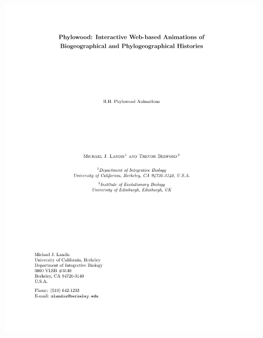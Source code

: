 \documentclass[11pt]{article}
\begin{document}
\begin{figure}
\begin{center}
\includegraphics[width=6.50in]{phylowood}
\label{phylowood}
\end{center}
\end{figure}
\end{document}
